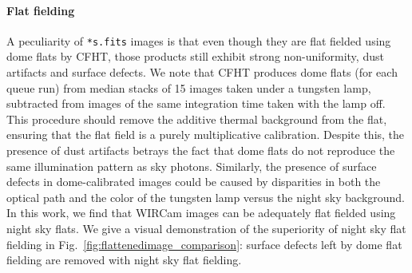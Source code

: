 \documentclass[iop,tighten]{emulateapj}
\newcommand{\Fig}[1]{Fig.~\ref{fig:#1}}  %
\begin{document}
\paragraph{Flat fielding} A peculiarity of \texttt{*s.fits} images is that even though they are flat fielded using dome flats by CFHT, those products still exhibit strong non-uniformity, dust artifacts and surface defects.
%
%
We note that CFHT produces dome flats (for each queue run) from median stacks of 15 images taken under a tungsten lamp, subtracted from images of the same integration time taken with the lamp off.
This procedure should remove the additive thermal background from the flat, ensuring that the flat field is a purely multiplicative calibration.
Despite this, the presence of dust artifacts betrays the fact that dome flats do not reproduce the same illumination pattern as sky photons.
Similarly, the presence of surface defects in dome-calibrated images could be caused by disparities in both the optical path and the color of the tungsten lamp versus the night sky background.
In this work, we find that WIRCam images can be adequately flat fielded using night sky flats.
We give a visual demonstration of the superiority of night sky flat fielding in \Fig{flattenedimage_comparison}: surface defects left by dome flat fielding are removed with night sky flat fielding.
\end{document}
